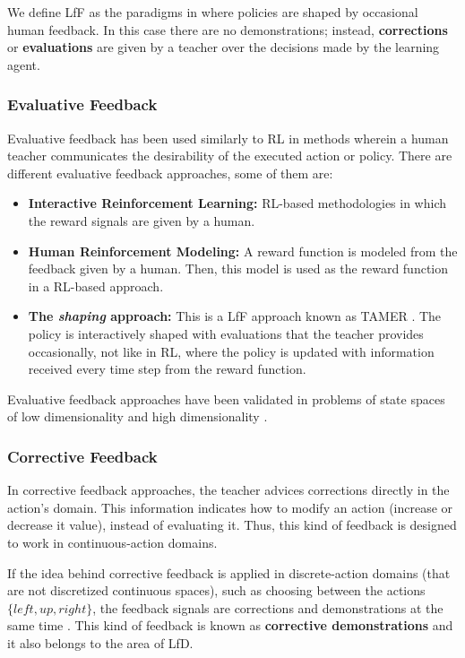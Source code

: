 We define LfF as the paradigms in where policies are shaped by occasional human feedback. In this case there are no demonstrations; instead, \textbf{corrections} or \textbf{evaluations} are given by a teacher over the decisions made by the learning agent.

\subsubsection{Evaluative Feedback}

Evaluative feedback has been used similarly to RL in methods wherein a human teacher communicates the desirability of the executed action or policy. There are different evaluative feedback approaches, some of them are:

\begin{itemize}
    \item \textbf{Interactive Reinforcement Learning:} RL-based methodologies in which the reward signals are given by a human.
    \item \textbf{Human Reinforcement Modeling:} A reward function is modeled from the feedback given by a human. Then, this model is used as the reward function in a RL-based approach.
    \item \textbf{The \emph{shaping} approach:} This is a LfF approach known as TAMER \cite{Knox:2009:ISA:1597735.1597738}. The policy is interactively shaped with evaluations that the teacher provides occasionally, not like in RL, where the policy is updated with information received every time step from the reward function.
\end{itemize}


Evaluative feedback approaches have been validated in problems of state spaces of low dimensionality \cite{Knox:2009:ISA:1597735.1597738,akrour2011preference,macglashan2017interactive} and high dimensionality \cite{Christiano2017,Warnell2017}.

\subsubsection{Corrective Feedback}

In corrective feedback approaches, the teacher advices corrections directly in the action's domain. This information indicates how to modify an action (increase or decrease it value), instead of evaluating it. Thus, this kind of feedback is designed to work in continuous-action domains. 

If the idea behind corrective feedback is applied in discrete-action domains (that are not discretized continuous spaces), such as choosing between the actions $\{left, up, right\}$, the feedback signals  are corrections and demonstrations at the same time \cite{chernova2009interactive, mericcli2010complementary}. This kind of feedback is known as \textbf{corrective demonstrations} and it also belongs to the area of LfD. 

